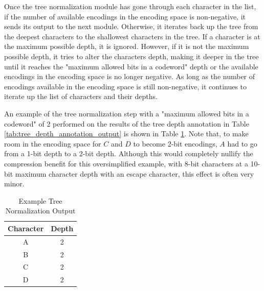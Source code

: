 \documentclass[doublespace,nopageskip]{VTthesis}
\begin{document}
Once the tree normalization module has gone through each character in the list, if the number of available encodings in the encoding space is non-negative, it sends its output to the next module. Otherwise, it iterates back up the tree from the deepest characters to the shallowest characters in the tree. If a character is at the maximum possible depth, it is ignored. However, if it is not the maximum possible depth, it tries to alter the characters depth, making it deeper in the tree until it reaches the "maximum allowed bits in a codeword" depth or the available encodings in the encoding space is no longer negative. As long as the number of encodings available in the encoding space is still non-negative, it continues to iterate up the list of characters and their depths.

An example of the tree normalization step with a "maximum allowed bits in a codeword" of 2 performed on the results of the tree depth annotation in Table \ref{tab:tree_depth_annotation_output} is shown in Table \ref{tab:tree_normalization_output}. Note that, to make room in the encoding space for $C$ and $D$ to become 2-bit encodings, $A$ had to go from a 1-bit depth to a 2-bit depth. Although this would completely nullify the compression benefit for this oversimplified example, with 8-bit characters at a 10-bit maximum character depth with an escape character, this effect is often very minor.

\begin{table}[htb]
	\centering
	\caption{Example Tree Normalization Output}
	\begin{tabular}{cc}
	    \toprule
	    Character & Depth \\
	    \midrule
	    A & 2 \\
	    \midrule
	    B & 2 \\
	    \midrule
	    C & 2 \\
	    \midrule
	    D & 2 \\
	    \bottomrule
	\end{tabular}
	\label{tab:tree_normalization_output}
\end{table}
\end{document}
